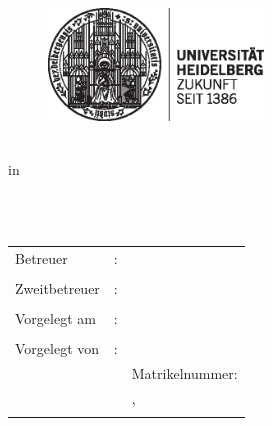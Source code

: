 \begin{titlepage}
\pagestyle{empty}

\begin{flushright}
\begin{figure}[ht]
\flushright
\includegraphics[height=3cm]{content/pictures/hd_siegel.eps}
\end{figure}
\end{flushright}

\begin{center}
{\fontsize{18}{22} \selectfont \docArtDerArbeit}\\[5mm]
{\fontsize{18}{22} \selectfont in} \\[5mm]
{\fontsize{18}{22} \selectfont \docStudiengang}\\
\vspace{1cm}
\begin{onehalfspace}
{\fontsize{22}{26} \selectfont \textbf{\docTitle}}\\[5mm]
{\fontsize{18}{22} \selectfont \docUntertitle}


\end{onehalfspace}
\end{center}

\vfill
\begin{center}
\begin{tabular}{lcl}
Betreuer  	&:& \docErsterReferent 	\\ 
                 &&\\
Zweitbetreuer	&:& \docZweiterReferent \\ 
                 &&\\
Vorgelegt am 	&:& \docAbgabedatum 	\\ 
                 &&\\
Vorgelegt von 	&:& \docVorname~\docNachname\\
		& & Matrikelnummer: \docMatrikelnummer\\
		& & \docStrasse,~\docPlz~\docOrt	\\
		& & \docEmail\\
\end{tabular}
\end{center}
\end{titlepage}